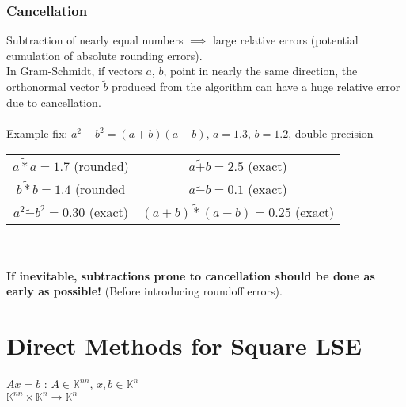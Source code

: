\documentclass[12pt]{article}
\begin{document}
\subsubsection{Cancellation}
Subtraction of nearly equal numbers $\implies$ large relative errors (potential cumulation of absolute rounding errors).\\
In Gram-Schmidt, if vectors $a$, $b$, point in nearly the same direction, the orthonormal vector $\tilde{b}$ produced from the algorithm can have a huge relative error due to cancellation.\\\\
Example fix: $a^2 - b^2 = (a+b)(a-b)$, $a=1.3$, $b=1.2$, double-precision\\
\begin{tabular}{cc}
$a \tilde{\ast}a = 1.7$ (rounded) & $a\tilde{+}b = 2.5$ (exact)\\
$b \tilde{\ast}b = 1.4$ (rounded & $a\tilde{-}b = 0.1$ (exact)\\
$a^2 \tilde{-} b^2 = 0.30$ (exact) & $(a+b) \tilde{\ast} (a-b) = 0.25$ (exact)
\end{tabular}\\\\
\textbf{If inevitable, subtractions prone to cancellation should be done as early as possible!} (Before introducing roundoff errors).
\subsubsection{}
\section{Direct Methods for Square LSE}
$Ax=b$ : $A \in \mathbb{K}^{nn}$, $x,b \in \mathbb{K}^n$\\
$\mathbb{K}^{nn} \times \mathbb{K}^n \to \mathbb{K}^n$
\subsection{} \subsection{} \subsection{} \subsection{}
\end{document}
